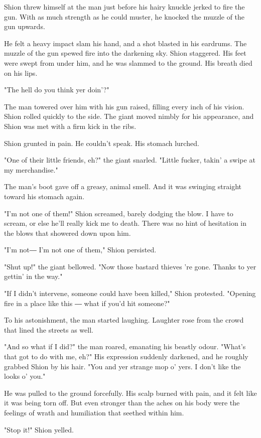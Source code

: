 Shion threw himself at the man just before his hairy knuckle jerked to
fire the gun. With as much strength as he could muster, he knocked the
muzzle of the gun upwards.

He felt a heavy impact slam his hand, and a shot blasted in his
eardrums. The muzzle of the gun spewed fire into the darkening sky.
Shion staggered. His feet were swept from under him, and he was slammed
to the ground. His breath died on his lips.

"The hell do you think yer doin'?"

The man towered over him with his gun raised, filling every inch of his
vision. Shion rolled quickly to the side. The giant moved nimbly for his
appearance, and Shion was met with a firm kick in the ribs.

Shion grunted in pain. He couldn't speak. His stomach lurched.

"One of their little friends, eh?" the giant snarled. "Little fucker,
takin' a swipe at my merchandise."

The man's boot gave off a greasy, animal smell. And it was swinging
straight toward his stomach again.

"I'm not one of them!" Shion screamed, barely dodging the blow. I have
to scream, or else he'll really kick me to death. There was no hint of
hesitation in the blows that showered down upon him.

"I'm not― I'm not one of them," Shion persisted.

"Shut up!" the giant bellowed. "Now those bastard thieves 're gone.
Thanks to yer gettin' in the way."

"If I didn't intervene, someone could have been killed," Shion
protested. "Opening fire in a place like this ― what if you'd hit
someone?"

To his astonishment, the man started laughing. Laughter rose from the
crowd that lined the streets as well.

"And so what if I did?" the man roared, emanating his beastly odour.
"What's that got to do with me, eh?" His expression suddenly darkened,
and he roughly grabbed Shion by his hair. "You and yer strange mop o'
yers. I don't like the looks o' you."

He was pulled to the ground forcefully. His scalp burned with pain, and
it felt like it was being torn off. But even stronger than the aches on
his body were the feelings of wrath and humiliation that seethed within
him.

"Stop it!" Shion yelled.

